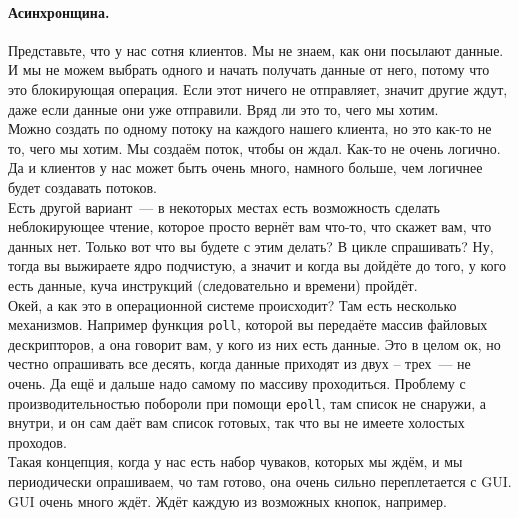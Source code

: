 \documentclass{article}
\begin{document}
    \paragraph{Асинхронщина.}
    Представьте, что у нас сотня клиентов. Мы не знаем, как они посылают данные. И мы не можем выбрать одного и начать получать данные от него, потому что это блокирующая операция. Если этот ничего не отправляет, значит другие ждут, даже если данные они уже отправили. Вряд ли это то, чего мы хотим.\\
    Можно создать по одному потоку на каждого нашего клиента, но это как-то не то, чего мы хотим. Мы создаём поток, чтобы он ждал. Как-то не очень логично. Да и клиентов у нас может быть очень много, намного больше, чем логичнее будет создавать потоков.\\
    Есть другой вариант~--- в некоторых местах есть возможность сделать неблокирующее чтение, которое просто вернёт вам что-то, что скажет вам, что данных нет. Только вот что вы будете с этим делать? В цикле спрашивать? Ну, тогда вы выжираете ядро подчистую, а значит и когда вы дойдёте до того, у кого есть данные, куча инструкций (следовательно и времени) пройдёт.\\
    Окей, а как это в операционной системе происходит? Там есть несколько механизмов. Например функция \texttt{poll}, которой вы передаёте массив файловых дескрипторов, а она говорит вам, у кого из них есть данные. Это в целом ок, но честно опрашивать все десять, когда данные приходят из двух -- трех~--- не очень. Да ещё и дальше надо самому по массиву проходиться. Проблему с производительностью побороли при помощи \texttt{epoll}, там список не снаружи, а внутри, и он сам даёт вам список готовых, так что вы не имеете холостых проходов.\\
    Такая концепция, когда у нас есть набор чуваков, которых мы ждём, и мы периодически опрашиваем, чо там готово, она очень сильно переплетается с GUI. GUI очень много ждёт. Ждёт каждую из возможных кнопок, например.
\end{document}
